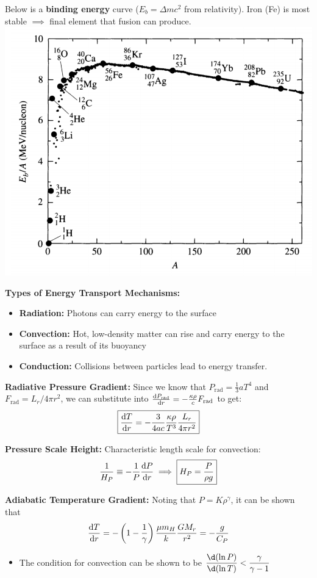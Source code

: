 \documentclass[12pt]{article}
\begin{document}
Below is a \textbf{binding energy} curve ($E_b = \Delta mc^2$ from relativity). Iron (Fe) is most stable $\implies$ final element that fusion can produce.\newline
\includegraphics[scale=0.5]{Figures/BindingEnergyCurve.png} 

\textbf{Types of Energy Transport Mechanisms:}
\begin{itemize}
    \item \textbf{Radiation:} Photons can carry energy to the surface
    \item \textbf{Convection:} Hot, low-density matter can rise and carry energy to the surface as a result of its buoyancy
    \item \textbf{Conduction:} Collisions between particles lead to energy transfer.
\end{itemize}

\textbf{Radiative Pressure Gradient:} Since we know that $P_{\text{rad}} = \frac{1}{3}aT^4$ and $F_{\text{rad}} = L_r/4\pi r^2$, we can substitute into $\dv{P_{\text{rad}}}{r} = -\frac{\kappa\rho}{c}F_\text{rad}$ to get: $$\boxed{\dv{T}{r} = -\frac{3}{4ac}\frac{\kappa\rho}{T^3}\frac{L_r}{4\pi r^2}}$$

\textbf{Pressure Scale Height:} Characteristic length scale for convection: $$\frac{1}{H_P} \equiv -\frac{1}{P}\dv{P}{r} \implies \boxed{H_P = \frac{P}{\rho g}}$$

\textbf{Adiabatic Temperature Gradient:} Noting that $P = K\rho^\gamma$, it can be shown that $$\dv{T}{r} = -\left(1 - \dfrac{1}{\gamma}\right)\frac{\mu m_H}{k}\frac{GM_r}{r^2} = -\dfrac{g}{C_P}$$
\begin{itemize}
    \item The condition for convection can be shown to be $\dfrac{\d(\ln P)}{\d(\ln T)} < \dfrac{\gamma}{\gamma - 1}$
\end{itemize}
\end{document}
